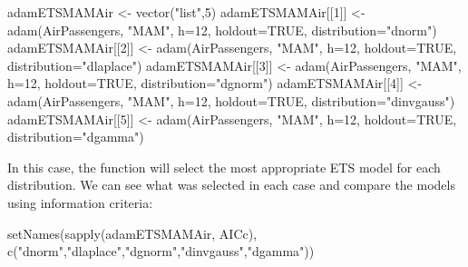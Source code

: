 \documentclass[
]{book}
\newenvironment{Shaded}{\begin{snugshade}}{\end{snugshade}}
\newcommand{\AttributeTok}[1]{\textcolor[rgb]{0.77,0.63,0.00}{#1}}
\newcommand{\ConstantTok}[1]{\textcolor[rgb]{0.00,0.00,0.00}{#1}}
\newcommand{\DecValTok}[1]{\textcolor[rgb]{0.00,0.00,0.81}{#1}}
\newcommand{\FunctionTok}[1]{\textcolor[rgb]{0.00,0.00,0.00}{#1}}
\newcommand{\NormalTok}[1]{#1}
\newcommand{\OtherTok}[1]{\textcolor[rgb]{0.56,0.35,0.01}{#1}}
\newcommand{\StringTok}[1]{\textcolor[rgb]{0.31,0.60,0.02}{#1}}
\theoremstyle{definition}
\theoremstyle{definition}
\theoremstyle{definition}
\theoremstyle{definition}
\theoremstyle{remark}
\begin{document}
\begin{Shaded}
\begin{Highlighting}[]
\NormalTok{adamETSMAMAir }\OtherTok{\textless{}{-}} \FunctionTok{vector}\NormalTok{(}\StringTok{"list"}\NormalTok{,}\DecValTok{5}\NormalTok{)}
\NormalTok{adamETSMAMAir[[}\DecValTok{1}\NormalTok{]] }\OtherTok{\textless{}{-}} \FunctionTok{adam}\NormalTok{(AirPassengers, }\StringTok{"MAM"}\NormalTok{, }\AttributeTok{h=}\DecValTok{12}\NormalTok{, }\AttributeTok{holdout=}\ConstantTok{TRUE}\NormalTok{,}
                           \AttributeTok{distribution=}\StringTok{"dnorm"}\NormalTok{)}
\NormalTok{adamETSMAMAir[[}\DecValTok{2}\NormalTok{]] }\OtherTok{\textless{}{-}} \FunctionTok{adam}\NormalTok{(AirPassengers, }\StringTok{"MAM"}\NormalTok{, }\AttributeTok{h=}\DecValTok{12}\NormalTok{, }\AttributeTok{holdout=}\ConstantTok{TRUE}\NormalTok{,}
                           \AttributeTok{distribution=}\StringTok{"dlaplace"}\NormalTok{)}
\NormalTok{adamETSMAMAir[[}\DecValTok{3}\NormalTok{]] }\OtherTok{\textless{}{-}} \FunctionTok{adam}\NormalTok{(AirPassengers, }\StringTok{"MAM"}\NormalTok{, }\AttributeTok{h=}\DecValTok{12}\NormalTok{, }\AttributeTok{holdout=}\ConstantTok{TRUE}\NormalTok{,}
                           \AttributeTok{distribution=}\StringTok{"dgnorm"}\NormalTok{)}
\NormalTok{adamETSMAMAir[[}\DecValTok{4}\NormalTok{]] }\OtherTok{\textless{}{-}} \FunctionTok{adam}\NormalTok{(AirPassengers, }\StringTok{"MAM"}\NormalTok{, }\AttributeTok{h=}\DecValTok{12}\NormalTok{, }\AttributeTok{holdout=}\ConstantTok{TRUE}\NormalTok{,}
                           \AttributeTok{distribution=}\StringTok{"dinvgauss"}\NormalTok{)}
\NormalTok{adamETSMAMAir[[}\DecValTok{5}\NormalTok{]] }\OtherTok{\textless{}{-}} \FunctionTok{adam}\NormalTok{(AirPassengers, }\StringTok{"MAM"}\NormalTok{, }\AttributeTok{h=}\DecValTok{12}\NormalTok{, }\AttributeTok{holdout=}\ConstantTok{TRUE}\NormalTok{,}
                           \AttributeTok{distribution=}\StringTok{"dgamma"}\NormalTok{)}
\end{Highlighting}
\end{Shaded}

In this case, the function will select the most appropriate ETS model for each distribution. We can see what was selected in each case and compare the models using information criteria:

\begin{Shaded}
\begin{Highlighting}[]
\FunctionTok{setNames}\NormalTok{(}\FunctionTok{sapply}\NormalTok{(adamETSMAMAir, AICc),}
         \FunctionTok{c}\NormalTok{(}\StringTok{"dnorm"}\NormalTok{,}\StringTok{"dlaplace"}\NormalTok{,}\StringTok{"dgnorm"}\NormalTok{,}\StringTok{"dinvgauss"}\NormalTok{,}\StringTok{"dgamma"}\NormalTok{))}
\end{Highlighting}
\end{Shaded}
\end{document}
